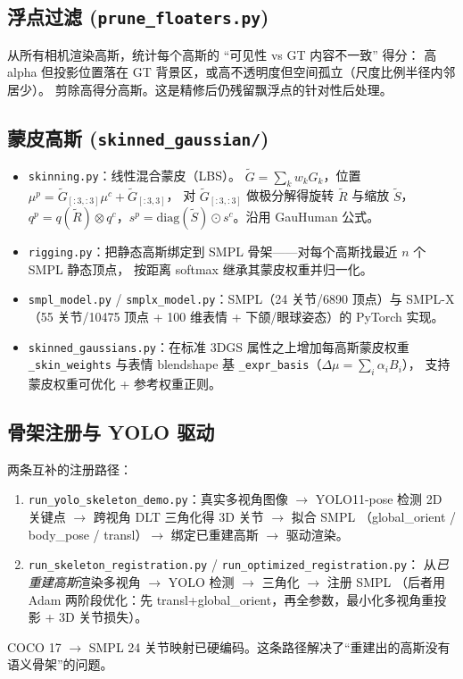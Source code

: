 \documentclass[11pt]{article}
\begin{document}
\subsection{浮点过滤 (\texttt{prune\_floaters.py})}
从所有相机渲染高斯，统计每个高斯的 ``可见性 vs GT 内容不一致'' 得分：
高 alpha 但投影位置落在 GT 背景区，或高不透明度但空间孤立（尺度比例半径内邻居少）。
剪除高得分高斯。这是精修后仍残留飘浮点的针对性后处理。

\subsection{蒙皮高斯 (\texttt{skinned\_gaussian/})}
\begin{itemize}[leftmargin=1.4em]
  \item \texttt{skinning.py}：线性混合蒙皮（LBS）。
        $\tilde{G}=\sum_k w_k G_k$，位置 $\mu^p=\tilde{G}_{[:3,:3]}\mu^c+\tilde{G}_{[:3,3]}$，
        对 $\tilde{G}_{[:3,:3]}$ 做极分解得旋转 $\tilde{R}$ 与缩放 $\tilde{S}$，
        $q^p=q(\tilde{R})\otimes q^c$，$s^p=\text{diag}(\tilde{S})\odot s^c$。沿用 GauHuman 公式。
  \item \texttt{rigging.py}：把静态高斯绑定到 SMPL 骨架——对每个高斯找最近 $n$ 个 SMPL 静态顶点，
        按距离 softmax 继承其蒙皮权重并归一化。
  \item \texttt{smpl\_model.py} / \texttt{smplx\_model.py}：SMPL（24 关节/6890 顶点）与
        SMPL-X（55 关节/10475 顶点 + 100 维表情 + 下颌/眼球姿态）的 PyTorch 实现。
  \item \texttt{skinned\_gaussians.py}：在标准 3DGS 属性之上增加每高斯蒙皮权重
        \texttt{\_skin\_weights} 与表情 blendshape 基 \texttt{\_expr\_basis}（$\Delta\mu=\sum_i\alpha_i B_i$），
        支持蒙皮权重可优化 + 参考权重正则。
\end{itemize}

\subsection{骨架注册与 YOLO 驱动}
两条互补的注册路径：
\begin{enumerate}[leftmargin=1.4em]
  \item \texttt{run\_yolo\_skeleton\_demo.py}：真实多视角图像 $\rightarrow$ YOLO11-pose 检测 2D 关键点
        $\rightarrow$ 跨视角 DLT 三角化得 3D 关节 $\rightarrow$ 拟合 SMPL
        （global\_orient / body\_pose / transl）$\rightarrow$ 绑定已重建高斯 $\rightarrow$ 驱动渲染。
  \item \texttt{run\_skeleton\_registration.py} / \texttt{run\_optimized\_registration.py}：
        从\emph{已重建高斯}渲染多视角 $\rightarrow$ YOLO 检测 $\rightarrow$ 三角化 $\rightarrow$ 注册 SMPL
        （后者用 Adam 两阶段优化：先 transl+global\_orient，再全参数，最小化多视角重投影 + 3D 关节损失）。
\end{enumerate}
COCO 17 $\rightarrow$ SMPL 24 关节映射已硬编码。这条路径解决了``重建出的高斯没有语义骨架''的问题。
\end{document}
